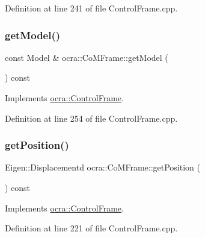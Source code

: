 Definition at line 241 of file Control\+Frame.\+cpp.

\hypertarget{classocra_1_1CoMFrame_afc280df9814e7eb2cf62f017f7bbfc2e}{}\label{classocra_1_1CoMFrame_afc280df9814e7eb2cf62f017f7bbfc2e} 
\subsubsection{\texorpdfstring{get\+Model()}{getModel()}}
{\footnotesize\ttfamily const Model \& ocra\+::\+Co\+M\+Frame\+::get\+Model (\begin{DoxyParamCaption}{ }\end{DoxyParamCaption}) const\hspace{0.3cm}{\ttfamily [virtual]}}



Implements \hyperlink{classocra_1_1ControlFrame_ab8a1e5e3d96d7524112b4c88bf0bc5ee}{ocra\+::\+Control\+Frame}.



Definition at line 254 of file Control\+Frame.\+cpp.

\hypertarget{classocra_1_1CoMFrame_a809c05664b2e2abb489e930e27fbe2d4}{}\label{classocra_1_1CoMFrame_a809c05664b2e2abb489e930e27fbe2d4} 
\subsubsection{\texorpdfstring{get\+Position()}{getPosition()}}
{\footnotesize\ttfamily Eigen\+::\+Displacementd ocra\+::\+Co\+M\+Frame\+::get\+Position (\begin{DoxyParamCaption}{ }\end{DoxyParamCaption}) const\hspace{0.3cm}{\ttfamily [virtual]}}



Implements \hyperlink{classocra_1_1ControlFrame_aaadbbfbcdd5b8e197a0f181ffb2fdcbe}{ocra\+::\+Control\+Frame}.



Definition at line 221 of file Control\+Frame.\+cpp.

\hypertarget{classocra_1_1CoMFrame_a02be3e73c64903d67b1e7ada25c468c5}{}\label{classocra_1_1CoMFrame_a02be3e73c64903d67b1e7ada25c468c5} 
